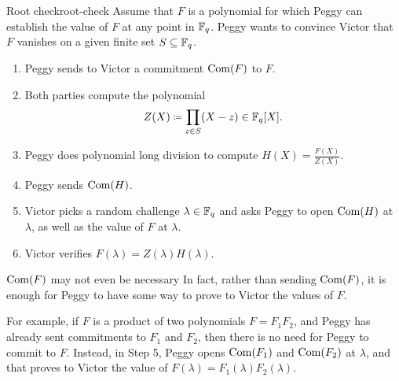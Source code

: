 \begin{algo}{Root check}{root-check}
Assume that $F$ is a polynomial for which Peggy can
establish the value of $F$ at any point in $\mathbb{F}_{q}$. Peggy
wants to convince Victor that $F$ vanishes on a given finite set
$S \subseteq \mathbb{F}_{q}$.

\begin{enumerate}
\item Peggy sends to Victor a commitment $\operatorname{Com}(F)$ to $F$.

\item Both parties compute the polynomial
  \[ Z(X) \defeq \prod_{z \in S}(X - z) \in \FF_{q}[X]. \]

\item Peggy does polynomial long division to compute
  $H(X) = \frac{F(X)}{Z(X)}$.

\item Peggy sends $\operatorname{Com}(H)$.

\item Victor picks a random challenge $\lambda \in \mathbb{F}_{q}$ and
  asks Peggy to open $\operatorname{Com}(H)$ at $\lambda$, as well
  as the value of $F$ at $\lambda$.

\item Victor verifies $F(\lambda) = Z(\lambda)H(\lambda)$.
\end{enumerate}
\end{algo}

\begin{remark}{$\operatorname{Com}(F)$ may not even be necessary}{}
  In fact, rather than sending $\operatorname{Com}(F)$,
  it is enough for Peggy to have some way to prove to Victor the values of $F$.

  For example, if $F$ is a product of two polynomials $F = F_{1}F_{2}$,
  and Peggy has already sent commitments to $F_{1}$ and $F_{2}$,
  then there is no need for Peggy to commit to $F$.
  Instead, in Step 5, Peggy opens $\operatorname{Com}(F_{1})$
  and $\operatorname{Com}(F_{2})$ at $\lambda$, and that proves to
  Victor the value of $F(\lambda) = F_{1}(\lambda)F_{2}(\lambda)$.
\end{remark}
